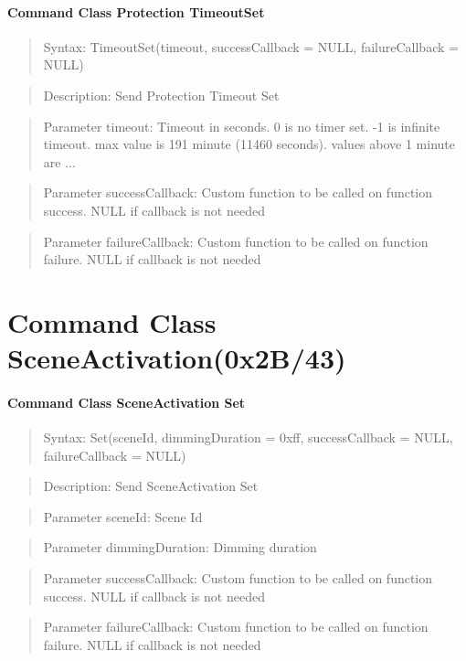 \paragraph {Command Class Protection TimeoutSet}
\begin{quote} Syntax: TimeoutSet(timeout, successCallback = NULL, failureCallback = NULL)\end{quote}
\begin{quote} Description: Send Protection Timeout Set\end{quote}
\begin{quote} Parameter timeout: Timeout in seconds. 0 is no timer set. -1 is infinite timeout. max value is 191 minute (11460 seconds). values above 1 minute are ...\end{quote}
\begin{quote} Parameter successCallback: Custom function to be called on function success. NULL if callback is not needed\end{quote}
\begin{quote} Parameter failureCallback: Custom function to be called on function failure. NULL if callback is not needed\end{quote}




\section{Command Class SceneActivation(0x2B/43)}

\paragraph {Command Class SceneActivation Set}
\begin{quote} Syntax: Set(sceneId, dimmingDuration = 0xff, successCallback = NULL, failureCallback = NULL)\end{quote}
\begin{quote} Description: Send SceneActivation Set\end{quote}
\begin{quote} Parameter sceneId: Scene Id\end{quote}
\begin{quote} Parameter dimmingDuration: Dimming duration\end{quote}
\begin{quote} Parameter successCallback: Custom function to be called on function success. NULL if callback is not needed\end{quote}
\begin{quote} Parameter failureCallback: Custom function to be called on function failure. NULL if callback is not needed\end{quote}

